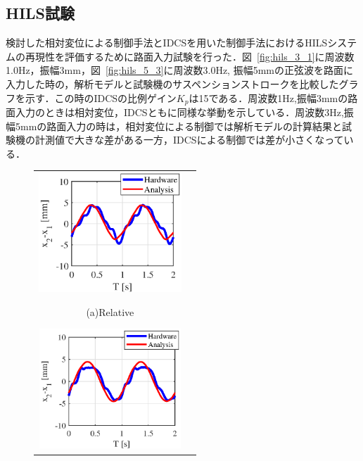 \documentclass[a4paper,12pt]{article_vdlab_sotsuron}
\begin{document}
\newpage
\subsection{HILS試験}
検討した相対変位による制御手法とIDCSを用いた制御手法におけるHILSシステムの再現性を評価するために路面入力試験を行った．図~\ref{fig:hils_3_1}に周波数1.0Hz，振幅3mm，図~\ref{fig:hils_5_3}に周波数3.0Hz, 振幅5mmの正弦波を路面に入力した時の，解析モデルと試験機のサスペンションストロークを比較したグラフを示す．この時のIDCSの比例ゲイン$K_p$は15である．周波数1Hz,振幅3mmの路面入力のときは相対変位，IDCSともに同様な挙動を示している．周波数3Hz,振幅5mmの路面入力の時は，相対変位による制御では解析モデルの計算結果と試験機の計測値で大きな差がある一方，IDCSによる制御では差が小さくなっている．

\vspace{5mm}
\begin{figure}[h]
  \begin{tabular}{cc}
  \begin{minipage}{0.33\hsize}
  \begin{center}
    \includegraphics[height=45mm]{figure/hils_rela_3_1.eps}
    \end{center}
    \begin{center}
    \ (a)Relative\
    \end{center}
  \end{minipage}
  \begin{minipage}{0.33\hsize}
     \begin{center}
      \includegraphics[height=45mm]{figure/hils_linear_sus_3_1.eps}
      \end{center}

\end{minipage}
\end{tabular}
\end{figure}
\end{document}
